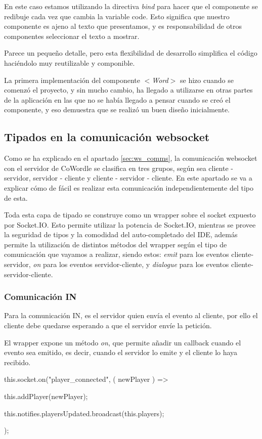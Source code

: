En este caso estamos utilizando la directiva \textit{bind} para hacer que el componente se redibuje cada vez que cambia la variable code. Esto significa que nuestro componente es ajeno al texto que presentamos, y es responsabilidad de otros componentes seleccionar el texto a mostrar.

Parece un pequeño detalle, pero esta flexibilidad de desarrollo simplifica el código haciéndolo muy reutilizable y componible.

La primera implementación del componente \textit{$<$Word$>$} se hizo cuando se comenzó el proyecto,  y sin mucho cambio, ha llegado a utilizarse en otras partes de la aplicación en las que no se había llegado a pensar cuando se creó el componente, y eso demuestra que se realizó un buen diseño inicialmente.

\subsection{Tipados en la comunicación websocket}
Como se ha explicado en el apartado \ref{sec:ws_comms}, la comunicación websocket con el servidor de CoWordle se clasifica en tres grupos, según sea cliente - servidor, servidor - cliente y cliente - servidor - cliente. En este apartado se va a explicar cómo de fácil es realizar esta comunicación independientemente del tipo de esta.

Toda esta capa de tipado se construye como un wrapper sobre el socket expuesto por Socket.IO. Esto permite utilizar la potencia de Socket.IO, mientras se provee la seguridad de tipos y la comodidad del auto-completado del IDE, además permite la utilización de distintos métodos del wrapper según el tipo de comunicación que vayamos a realizar, siendo estos: \textit{emit} para los eventos cliente-servidor, \textit{on} para los eventos servidor-cliente, y \textit{dialogue} para los eventos cliente-servidor-cliente.


\subsubsection{Comunicación IN}
Para la comunicación IN, es el servidor quien envía el evento al cliente, por ello el cliente debe quedarse esperando a que el servidor envíe la petición.

El wrapper expone un método \textit{on}, que permite añadir un callback cuando el evento sea emitido, es decir, cuando el servidor lo emite y el cliente lo haya recibido.

\begin{mytypescript}[float={!h},caption={Uso de eventos websocket IN.},label={alg:ws_in_usage}]
	this.socket.on("player_connected", ({ newPlayer }) => {
		this.addPlayer(newPlayer);
																								
		this.notifies.playersUpdated.broadcast(this.players);
	}); 
\end{mytypescript}

